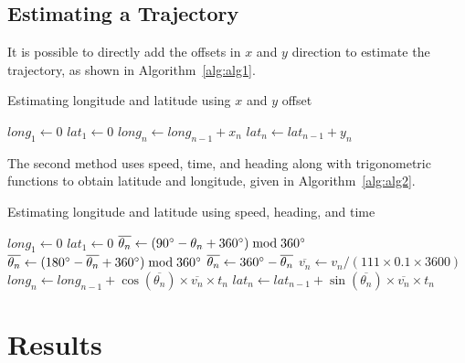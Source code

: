 \documentclass[preprint,12pt]{elsarticle}
\begin{document}
\subsection{Estimating a Trajectory}

It is possible to directly add the offsets in $x$ and $y$ direction to estimate the trajectory, as shown in Algorithm~\ref{alg:alg1}.

\begin{algorithm}[H] 
\caption{Estimating longitude and latitude using $x$ and $y$ offset}\label{alg:alg1}
\begin{algorithmic} 
\STATE $long_{1} \gets 0$
\STATE $lat_{1} \gets 0$ 
\STATE $long_{n} \gets long_{n-1} + x_{n}$ 
\STATE $lat_{n} \gets lat_{n-1} + y_{n}$ 
\ENDFOR
\end{algorithmic}
\end{algorithm}
 
The second method uses speed, time, and heading along with trigonometric functions to obtain latitude and longitude, given in Algorithm~\ref{alg:alg2}.
 
\begin{algorithm}[H] 
\caption{Estimating longitude and latitude using speed, heading, and time}\label{alg:alg2}
\begin{algorithmic} 
\STATE $long_{1} \gets 0$
\STATE $lat_{1} \gets 0$
\STATE $\overline{\theta_{n}} \gets (90\degree - \theta_{n} + 360\degree) \bmod 360\degree$ 
 \STATE $\overline{\theta_{n}} \gets (180\degree - \overline{\theta_{n}} + 360\degree) \bmod 360\degree$  \ENDIF 
{} \STATE $\overline{\theta_{n}} \gets 360\degree - \overline{\theta_{n}}$ \ENDIF 
\STATE $\overline{v_{n}} \gets v_{n} / (111 \times 0.1 \times 3600)$
\STATE $long_{n} \gets long_{n-1} + \cos{\left(\overline{\theta_{n}}\right)} \times \overline{v_{n}} \times t_{n}$ 
\STATE $lat_{n} \gets lat_{n-1} + \sin{\left(\overline{\theta_{n}}\right)} \times \overline{v_{n}} \times t_{n}$ 
\ENDFOR
\end{algorithmic}
\end{algorithm}

\section{Results}
\label{sec:Results}
\end{document}
